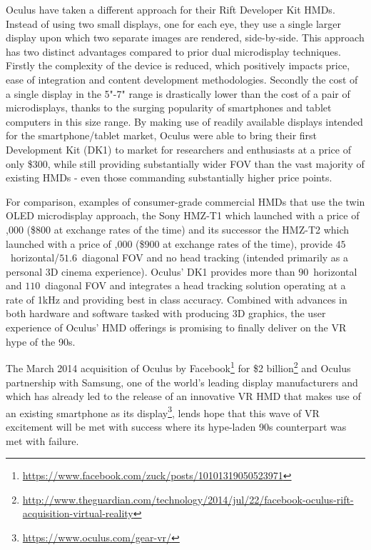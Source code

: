 Oculus have taken a different approach for their Rift Developer Kit HMDs. Instead of using two small displays, one for each eye, they use a single larger display upon which two separate images are rendered, side-by-side. This approach has two distinct advantages compared to prior dual microdisplay techniques. Firstly the complexity of the device is reduced, which positively impacts price, ease of integration and content development methodologies. Secondly the cost of a single display in the 5"-7" range is drastically lower than the cost of a pair of microdisplays, thanks to the surging popularity of smartphones and tablet computers in this size range. By making use of readily available displays intended for the smartphone/tablet market, Oculus were able to bring their first Development Kit (DK1) to market for researchers and enthusiasts at a price of only \$300, while still providing substantially wider FOV than the vast majority of existing HMDs - even those commanding substantially higher price points.

For comparison, examples of consumer-grade commercial HMDs that use the twin OLED microdisplay approach, the Sony HMZ-T1 which launched with a price of ,000 (\$800 at exchange rates of the time) and its successor the HMZ-T2 which launched with a price of ,000 (\$900 at exchange rates of the time), provide $45$\textdegree\ horizontal/$51.6$\textdegree\ diagonal FOV and no head tracking (intended primarily as a personal 3D cinema experience). Oculus' DK1 provides more than $90$\textdegree\ horizontal and $110$\textdegree\ diagonal FOV and integrates a head tracking solution operating at a rate of 1kHz and providing best in class accuracy. Combined with advances in both hardware and software tasked with producing 3D graphics, the user experience of Oculus' HMD offerings is promising to finally deliver on the VR hype of the 90s.

The March 2014 acquisition of Oculus by Facebook\footnote{\url{https://www.facebook.com/zuck/posts/10101319050523971}} for \$2 billion\footnote{\url{http://www.theguardian.com/technology/2014/jul/22/facebook-oculus-rift-acquisition-virtual-reality}} and Oculus partnership with Samsung, one of the world's leading display manufacturers and which has already led to the release of an innovative VR HMD that makes use of an existing smartphone as its display\footnote{\url{https://www.oculus.com/gear-vr/}}, lends hope that this wave of VR excitement will be met with success where its hype-laden 90s counterpart was met with failure.

